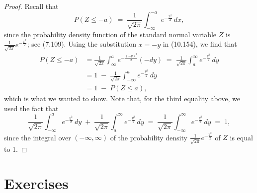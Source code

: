 \begin{proof}
Recall that
\begin{equation}
P(Z \le -a) \;=\; \frac{1}{\sqrt{2\pi}}\int_{-\infty}^{-a} e^{-\frac{x^2}{2}}\,dx,
\end{equation}
since the probability density function of the standard normal variable $Z$ is
$\frac{1}{\sqrt{2\pi}}e^{-\frac{x^2}{2}}$; see (7.109). Using the substitution $x =
-y$ in (10.154), we find that
\begin{align*}
P(Z \le -a) &= \frac{1}{\sqrt{2\pi}}\int_\infty^a e^{-\frac{(-y)^2}{2}}(-dy)
\;=\; \frac{1}{\sqrt{2\pi}}\int_a^\infty e^{-\frac{y^2}{2}}\,dy \\
&= 1 \;-\; \frac{1}{\sqrt{2\pi}}\int_{-\infty}^a e^{-\frac{y^2}{2}}\,dy \\
&= 1 \;-\; P(Z \le a),
\end{align*}
which is what we wanted to show. Note that, for the third equality above, we used
the fact that
\[
\frac{1}{\sqrt{2\pi}}\int_{-\infty}^a e^{-\frac{y^2}{2}}\,dy \;+\;
\frac{1}{\sqrt{2\pi}}\int_a^\infty e^{-\frac{y^2}{2}}\,dy \;=\;
\frac{1}{\sqrt{2\pi}}\int_{-\infty}^\infty e^{-\frac{y^2}{2}}\,dy \;=\; 1,
\]
since the integral over $(-\infty,\infty)$ of the probability density
$\frac{1}{\sqrt{2\pi}}e^{-\frac{y^2}{2}}$ of $Z$ is equal to 1.
\end{proof}

\section{Exercises}

